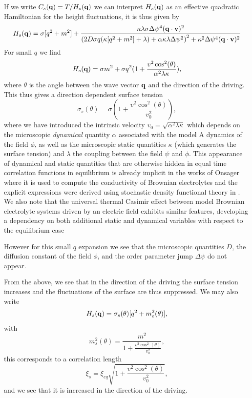 If we write $C_s({\bf q})= T/H_s({\bf q})$ we can interpret $H_s({\bf q})$ as an effective quadratic Hamiltonian for the height fluctuations, it is thus given by
\begin{equation}
    H_s({\bf q}) = \sigma[q^2+m^2] + \frac{\kappa\lambda\sigma \Delta\psi^4 ({\bf q}\cdot{\bf v})^2}{\left(2 D\sigma q(\kappa[q^2+m^2]+\lambda)+\alpha\kappa\lambda\Delta\psi^2\right)^2 +\kappa^2 \Delta\psi^4 ({\bf q}\cdot{\bf v})^2}
\end{equation}
For small $q$ we find 
\begin{equation}
    H_s({\bf q}) = \sigma m^2 + \sigma q^2(1+ \frac{v^2\cos^2(\theta)}{\alpha^2\lambda\kappa}),
\end{equation}
where $\theta$ is the angle between the wave vector ${\bf q}$ and the direction of the driving. 
This thus gives a direction dependent surface tension 
\begin{equation}
    \sigma_s(\theta) = \sigma(1+ \frac{v^2\cos^2(\theta)}{v^2_0}),
\end{equation}
where we have introduced the intrinsic velocity $v_0 = \sqrt{\alpha^2\lambda\kappa}$ which depends on the microscopic {\em dynamical} quantity $\alpha$ associated with the model A dynamics of the field $\phi$, as well as the microscopic static quantities $\kappa$ (which generates the surface tension) and $\lambda$ the coupling between the field $\psi$ and $\phi$. This appearance of dynamical and static quantities that are otherwise hidden in equal time correlation functions in equilibrium is already implicit in the works of Onsager \cite{lars_onsager_collected_1996} where it is used to compute the conductivity of Brownian electrolytes and the explicit expressions were derived using stochastic density functional theory in \cite{demery_conductivity_2016}. We also note that the universal thermal Casimir effect between model Brownian electrolyte systems  driven by an electric field 
exhibits similar features, developing a dependency on both additional static and dynamical variables with respect to the equilibrium case \cite{dean_nonequilibrium_2016}


However for this small $q$ expansion we see that the microscopic 
quantities $D$, the diffusion constant of the field $\phi$, and the order parameter jump
$\Delta\psi$ do not appear. 

From the above, we see that  in the direction of the driving the surface tension increases and the fluctuations of the surface are thus suppressed. We may also write 
\begin{equation}
    H_s({\bf q}) = \sigma_s(\theta) [q^2 + m^2_e(\theta)],
\end{equation}
with 
\begin{equation}
    m^2_s(\theta) =\frac{ m^2}{1+ \frac{v^2\cos^2(\theta)}{v_0^2}},
\end{equation}
this corresponds to a correlation length 
\begin{equation}
    \xi_s = \xi_{eq}\sqrt{1+ \frac{v^2\cos^2(\theta)}{v_0^2}},
\end{equation}
and we see that it is increased in the direction of the driving. 

